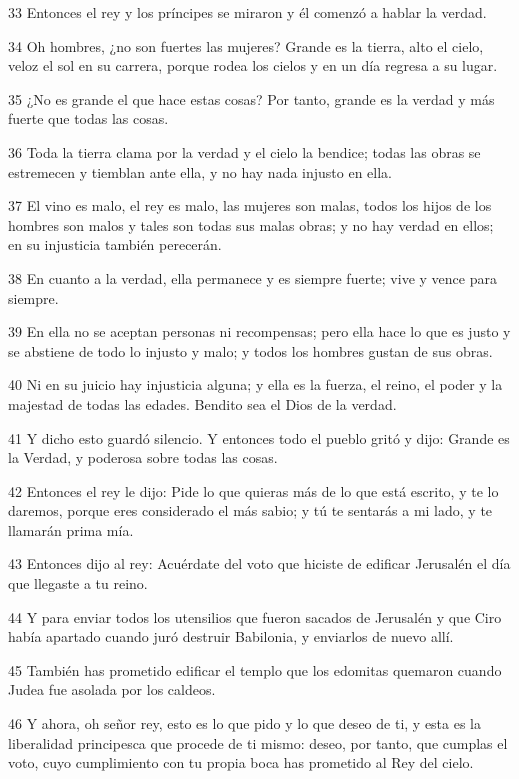 \par 33 Entonces el rey y los príncipes se miraron y él comenzó a hablar la verdad.
\par 34 Oh hombres, ¿no son fuertes las mujeres? Grande es la tierra, alto el cielo, veloz el sol en su carrera, porque rodea los cielos y en un día regresa a su lugar.
\par 35 ¿No es grande el que hace estas cosas? Por tanto, grande es la verdad y más fuerte que todas las cosas.
\par 36 Toda la tierra clama por la verdad y el cielo la bendice; todas las obras se estremecen y tiemblan ante ella, y no hay nada injusto en ella.
\par 37 El vino es malo, el rey es malo, las mujeres son malas, todos los hijos de los hombres son malos y tales son todas sus malas obras; y no hay verdad en ellos; en su injusticia también perecerán.
\par 38 En cuanto a la verdad, ella permanece y es siempre fuerte; vive y vence para siempre.
\par 39 En ella no se aceptan personas ni recompensas; pero ella hace lo que es justo y se abstiene de todo lo injusto y malo; y todos los hombres gustan de sus obras.
\par 40 Ni en su juicio hay injusticia alguna; y ella es la fuerza, el reino, el poder y la majestad de todas las edades. Bendito sea el Dios de la verdad.
\par 41 Y dicho esto guardó silencio. Y entonces todo el pueblo gritó y dijo: Grande es la Verdad, y poderosa sobre todas las cosas.
\par 42 Entonces el rey le dijo: Pide lo que quieras más de lo que está escrito, y te lo daremos, porque eres considerado el más sabio; y tú te sentarás a mi lado, y te llamarán prima mía.
\par 43 Entonces dijo al rey: Acuérdate del voto que hiciste de edificar Jerusalén el día que llegaste a tu reino.
\par 44 Y para enviar todos los utensilios que fueron sacados de Jerusalén y que Ciro había apartado cuando juró destruir Babilonia, y enviarlos de nuevo allí.
\par 45 También has prometido edificar el templo que los edomitas quemaron cuando Judea fue asolada por los caldeos.
\par 46 Y ahora, oh señor rey, esto es lo que pido y lo que deseo de ti, y esta es la liberalidad principesca que procede de ti mismo: deseo, por tanto, que cumplas el voto, cuyo cumplimiento con tu propia boca has prometido al Rey del cielo.
